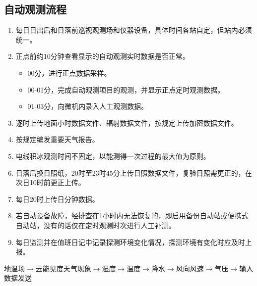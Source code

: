 ﻿\documentclass[UTF8,11pt]{ctexbook}%
\begin{document}
\subsection{自动观测流程}

\begin{enumerate}
	\item 每日日出后和日落前巡视观测场和仪器设备，具体时间各站自定，但站内必须统一。
	\item 正点前约10分钟查看显示的自动观测实时数据是否正常。
	\begin{itemize}
		\item 00分，进行正点数据采样。
		\item 00-01分，完成自动观测项目的观测，并显示正点定时观测数据。
		\item 01-03分，向微机内录入人工观测数据。
	\end{itemize}
	\item 逐时上传地面小时数据文件、辐射数据文件，按规定上传加密数据文件。
	\item 按规定编发重要天气报告。
	\item 电线积冰观测时间不固定，以能测得一次过程的最大值为原则。
	\item 日落后换日照纸，20时至23时45分上传日照数据文件，复验日照需更正的，在次日10时前更正上传。
	\item 每日20时上传日分钟数据。
	\item 若自动设备故障，经排查在1小时内无法恢复的，即启用备份自动站或便携式自动站，没有的话仅在定时观测时次进行人工补测。
	\item 每日监测并在值班日记中记录探测环境变化情况，探测环境有变化时应及时上报。
\end{enumerate}

地温场\(\to\)云能见度天气现象\(\to\)湿度\(\to\)温度\(\to\)降水\(\to\)风向风速\(\to\)气压\(\to\)输入数据发送
\end{document}
